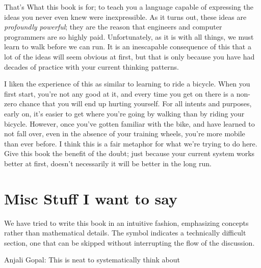 That's What this book is for; to teach you a language capable of
expressing the ideas you never even knew were inexpressible. As it turns out, these ideas are \textit{profoundly
powerful}; they are the reason that engineers and computer programmers are so highly paid. Unfortunately, as it is with
all things, we must learn to walk before we can run. It is an inescapable consequence of this that a lot of the ideas
will seem obvious at first, but that is only because you have had decades of practice with your current thinking
patterns.

I liken the experience of this as similar to learning to ride a bicycle.
When you first start, you're not any good at it, and every time you get on there is a non-zero chance that you will end
up hurting yourself. For all intents and purposes, early on, it's easier to get where you're going by walking than by
riding your bicycle. However, once you've gotten familiar with the bike, and have learned to not fall over, even in the
absence of your training wheels, you're more mobile than ever before. I think this is a fair metaphor for what we're
trying to do here. Give this book the benefit of the doubt; just because your current system works better at first,
doesn't necessarily it will be better in the long run.

\section{Misc Stuff I want to say}
We have tried to write this book in an intuitive fashion, emphasizing concepts rather than mathematical details.
The symbol \difficult indicates a technically difficult section, one that can be skipped without interrupting the flow
of the discussion.

Anjali Gopal: This is neat to systematically think about



